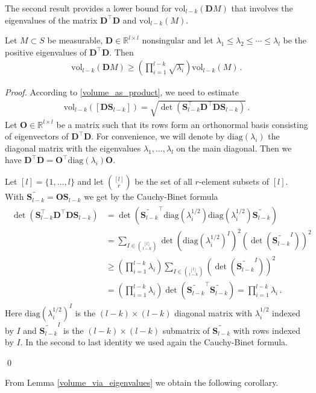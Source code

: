 \documentclass[runningheads]{llncs}
\newcommand{\ve}{\boldsymbol}
\newcommand{\bea}{\begin{eqnarray*}}
\newcommand{\eea}{\end{eqnarray*}}
\newcommand{\diag}{\mathrm{diag}}
\newcommand{\vol}{\mathrm{vol}}
\newcommand{\R}{\mathbb R}
\renewcommand\>{\rangle}
\newcommand\<{\langle}
\newcommand\0{\mathbf{0}}
\renewcommand\SS{\ve S}
\newcommand\DD{\ve D}%
\newcommand\OO{\ve O}%
\begin{document}
The second result provides a lower bound for $\vol_{l-k}(\DD M)$ that involves the eigenvalues of the matrix $\DD^\top \DD$ and $\vol_{l-k}(M)$.

\begin{lemma} \label{volume_via_eigenvalues}
Let $M\subset S$ be measurable, $\DD\in\R^{l\times l}$ nonsingular and let $\lambda_1\le \lambda_2\le \cdots \le \lambda_l$
be the positive eigenvalues of $\DD^\top \DD$. Then
\bea \vol_{l-k}(\DD M)\ge \left(\prod_{i=1}^{l-k} \sqrt{\lambda_i}\right) \vol_{l-k}(M)\,.\eea
\end{lemma}

\begin{proof}
According to \eqref{volume_as_product}, we need to estimate 
\bea
\vol_{l-k}([\DD \SS_{l-k}])=\sqrt{\det(\SS^\top_{l-k}\DD^\top\DD \SS_{l-k})}\,.
\eea
Let $\OO\in\R^{l\times l}$ be a matrix such that its rows form an orthonormal basis consisting of eigenvectors 
of $\DD^\top \DD$.  For convenience, we will denote by $\diag(\lambda_i)$ the diagonal matrix with the eigenvalues $\lambda_1,\ldots, \lambda_l$ on the main diagonal. Then we have $\DD^\top \DD=\OO^\top \diag(\lambda_i)\OO$. 

Let $[l]= \{1,\ldots,l\}$ and let $\binom{[l]}{r}$ be the set of all $r$-element subsets of $[l]$. 
%
With $\widetilde{\SS_{l-k}}=\OO\SS_{l-k}$ we get by the Cauchy-Binet formula
\bea
\begin{aligned}
\det(\SS^\top_{l-k}\DD^\top \DD \SS_{l-k}) &= \det(\widetilde{\SS_{l-k}}^\top \diag(\lambda_i^{1/2})\diag(\lambda_i^{1/2})\widetilde{\SS_{l-k}})\\
&=\sum_{I\in {[l]\choose l-k}}\det(\diag(\lambda_i^{1/2})^I)^2 (\det(\widetilde{\SS_{l-k}}^I))^2\\
&\ge \left(\prod_{i=1}^{l-k}\lambda_i\right) \sum_{I\in {[l]\choose
    l-k}}(\det(\widetilde{\SS_{l-k}}^I))^2\\
&= \left(\prod_{i=1}^{l-k}\lambda_i\right) \det(\widetilde{\SS_{l-k}}^\top \widetilde{\SS_{l-k}} )= \prod_{i=1}^{l-k}\lambda_i\,.
\end{aligned}
\eea
%
Here $\diag(\lambda_i^{1/2})^I$ is the $(l-k)\times(l-k)$ diagonal matrix with $\lambda_i^{1/2}$ indexed by $I$
and $\widetilde{\SS_{l-k}}^I$ is the $(l-k)\times(l-k)$ submatrix of
$\widetilde{\SS_{l-k}}$ with rows indexed by $I$. In the second to
last identity we used again the Cauchy-Binet formula.

\qed\end{proof}

From Lemma \ref{volume_via_eigenvalues} we  obtain the following corollary.
\end{document}
